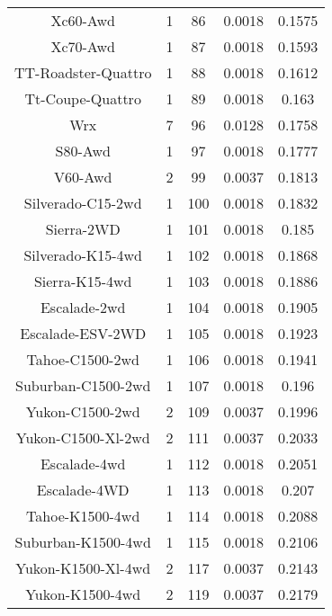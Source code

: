 \begin{center}
\begin{tabular}{|c|c|c|c|@{}c@{}|}
Xc60-Awd & 1 & 86 & 0.0018 & 0.1575 \\ 
Xc70-Awd & 1 & 87 & 0.0018 & 0.1593 \\ 
TT-Roadster-Quattro & 1 & 88 & 0.0018 & 0.1612 \\ 
Tt-Coupe-Quattro & 1 & 89 & 0.0018 & 0.163 \\ 
Wrx & 7 & 96 & 0.0128 & 0.1758 \\ 
S80-Awd & 1 & 97 & 0.0018 & 0.1777 \\ 
V60-Awd & 2 & 99 & 0.0037 & 0.1813 \\ 
Silverado-C15-2wd & 1 & 100 & 0.0018 & 0.1832 \\ 
Sierra-2WD & 1 & 101 & 0.0018 & 0.185 \\ 
Silverado-K15-4wd & 1 & 102 & 0.0018 & 0.1868 \\ 
Sierra-K15-4wd & 1 & 103 & 0.0018 & 0.1886 \\ 
Escalade-2wd & 1 & 104 & 0.0018 & 0.1905 \\ 
Escalade-ESV-2WD & 1 & 105 & 0.0018 & 0.1923 \\ 
Tahoe-C1500-2wd & 1 & 106 & 0.0018 & 0.1941 \\ 
Suburban-C1500-2wd & 1 & 107 & 0.0018 & 0.196 \\ 
Yukon-C1500-2wd & 2 & 109 & 0.0037 & 0.1996 \\ 
Yukon-C1500-Xl-2wd & 2 & 111 & 0.0037 & 0.2033 \\ 
Escalade-4wd & 1 & 112 & 0.0018 & 0.2051 \\ 
Escalade-4WD & 1 & 113 & 0.0018 & 0.207 \\ 
Tahoe-K1500-4wd & 1 & 114 & 0.0018 & 0.2088 \\ 
Suburban-K1500-4wd & 1 & 115 & 0.0018 & 0.2106 \\ 
Yukon-K1500-Xl-4wd & 2 & 117 & 0.0037 & 0.2143 \\ 
Yukon-K1500-4wd & 2 & 119 & 0.0037 & 0.2179 \\ 
\hline
\end{tabular}
\end{center} \vfill


